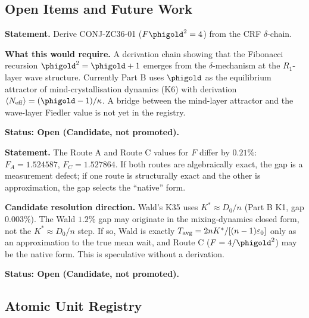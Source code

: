 \documentclass[12pt, a4paper]{article}
\begin{document}
\subsection{Open Items and Future Work}
\label{sec:open}

\begin{openqbox}[title={GAP-ZC36-01: Structural Derivation of
  $F\phigold^2 = 4$}]
\textbf{Statement.} Derive CONJ-ZC36-01
($F\phigold^2 = 4$) from the CRF $\delta$-chain.

\medskip
\textbf{What this would require.}
A derivation chain showing that the Fibonacci recursion
$\phigold^2 = \phigold + 1$ emerges from the $\delta$-mechanism
at the $R_1$-layer wave structure. Currently Part B uses
$\phigold$ as the equilibrium attractor of mind-crystallisation
dynamics (K6) with derivation
$\langle N_{\rm eff}\rangle = (\phigold - 1)/\kappa$. A bridge
between the mind-layer attractor and the wave-layer Fiedler
value is not yet in the registry.

\medskip
\textbf{Status: Open (Candidate, not promoted).}
\end{openqbox}

\begin{openqbox}[title={GAP-ZC36-02: Route A vs Route C
  Native-Form Resolution}]
\textbf{Statement.} The Route A and Route C values for $F$
differ by $0.21\%$:
$F_A = 1.524587$, $F_C = 1.527864$. If both routes are
algebraically exact, the gap is a measurement defect; if one
route is structurally exact and the other is approximation, the
gap selects the ``native'' form.

\medskip
\textbf{Candidate resolution direction.}
Wald's K35 uses $K^* \approx D_0/n$ (Part B K1, gap $0.003\%$).
The Wald $1.2\%$ gap may originate in the mixing-dynamics
closed form, not the $K^* \approx D_0/n$ step. If so, Wald is
exactly $T_{\rm avg} = 2nK^*/[(n-1)\varepsilon_0]$ only as an
approximation to the true mean wait, and Route C
($F = 4/\phigold^2$) may be the native form. This is speculative
without a derivation.

\medskip
\textbf{Status: Open (Candidate, not promoted).}
\end{openqbox}

\subsection{Atomic Unit Registry}
\label{sec:registry}
\end{document}
